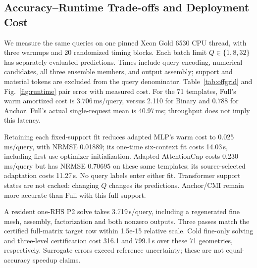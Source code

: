 \documentclass[conference,9pt,letterpaper]{IEEEtran}
\begin{document}
\subsection{Accuracy--Runtime Trade-offs and Deployment Cost}
We measure the same queries on one pinned Xeon Gold 6530 CPU thread,
with three warmups and 20 randomized timing blocks. Each batch limit
$Q\in\{1,8,32\}$ has separately evaluated predictions. Times include
query encoding, numerical candidates, all three ensemble members, and output
assembly; support and material tokens are excluded from the query denominator.
Table~\ref{tab:offgrid} and Fig.~\ref{fig:runtime} pair error with measured cost.
For the 71 templates, Full's warm amortized cost is
3.706\,ms/query, versus 2.110 for Binary
and 0.788 for Anchor. Full's actual single-request mean
is 40.97\,ms; throughput does not imply this latency.

Retaining each fixed-support fit reduces adapted MLP's warm cost to
0.025\,ms/query, with NRMSE 0.01889;
its one-time six-context fit costs 14.03\,s,
including first-use optimizer initialization. Adapted AttentionCap costs
0.230\,ms/query but has NRMSE 0.70695
on these same templates; its source-selected adaptation costs
11.27\,s. No query labels enter either fit.
Transformer support states are not cached: changing $Q$ changes its predictions.
Anchor/CMI remain more accurate than Full with this full support.

A resident one-RHS P2 solve takes 3.719\,s/query,
including a regenerated fine mesh, assembly, factorization and both nonzero
outputs. Three passes match the certified full-matrix target row within
1.5e-15 relative scale. Cold fine-only solving and
three-level certification cost 316.1 and
799.1\,s over these 71 geometries, respectively.
Surrogate errors exceed reference uncertainty; these are not equal-accuracy
speedup claims.
\end{document}
